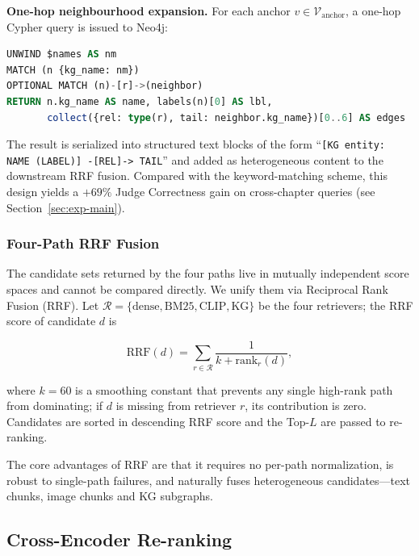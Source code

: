 \documentclass[applsci,article,submit,pdftex,moreauthors]{Definitions/mdpi}
\begin{document}
\textbf{One-hop neighbourhood expansion.} For each anchor $v\in\mathcal{V}_{\text{anchor}}$, a one-hop Cypher query is issued to Neo4j:

\begin{lstlisting}[language=SQL,caption={Subgraph recall driven by ANN anchors.}]
UNWIND $names AS nm
MATCH (n {kg_name: nm})
OPTIONAL MATCH (n)-[r]->(neighbor)
RETURN n.kg_name AS name, labels(n)[0] AS lbl,
       collect({rel: type(r), tail: neighbor.kg_name})[0..6] AS edges
\end{lstlisting}

The result is serialized into structured text blocks of the form ``\texttt{[KG entity: NAME (LABEL)] -[REL]-> TAIL}'' and added as heterogeneous content to the downstream RRF fusion. Compared with the keyword-matching scheme, this design yields a $+69\%$ Judge Correctness gain on cross-chapter queries (see Section~\ref{sec:exp-main}).

\subsubsection{Four-Path RRF Fusion}
\label{sec:rrf}

The candidate sets returned by the four paths live in mutually independent score spaces and cannot be compared directly. We unify them via Reciprocal Rank Fusion (RRF). Let $\mathcal{R}=\{\text{dense}, \text{BM25}, \text{CLIP}, \text{KG}\}$ be the four retrievers; the RRF score of candidate $d$ is
\begin{linenomath}
\begin{equation}
\text{RRF}(d) = \sum_{r\in\mathcal{R}}\frac{1}{k+\text{rank}_r(d)},
\label{eq:rrf}
\end{equation}
\end{linenomath}
where $k=60$ is a smoothing constant that prevents any single high-rank path from dominating; if $d$ is missing from retriever $r$, its contribution is zero. Candidates are sorted in descending RRF score and the Top-$L$ are passed to re-ranking.

The core advantages of RRF are that it requires no per-path normalization, is robust to single-path failures, and naturally fuses heterogeneous candidates---text chunks, image chunks and KG subgraphs.

\subsection{Cross-Encoder Re-ranking}
\label{sec:rerank}
\end{document}
